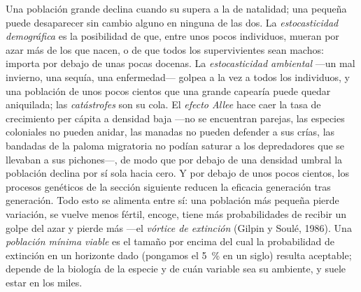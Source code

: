 \begin{definition}\label{def:b3:conservation-biology:small}
Una población grande declina cuando su  supera a la
de natalidad; una pequeña puede desaparecer sin cambio alguno en
ninguna de las dos. La \emph{estocasticidad demográfica} es la
posibilidad de que, entre unos pocos individuos, mueran por azar más de
los que nacen, o de que todos los supervivientes sean machos: importa
por debajo de unas pocas docenas. La \emph{estocasticidad ambiental}
---un mal invierno, una sequía, una enfermedad--- golpea a la vez a
todos los individuos, y una población de unos pocos cientos que una
grande capearía puede quedar aniquilada; las \emph{catástrofes} son su
cola. El \emph{efecto Allee} hace caer la tasa de crecimiento per
cápita a densidad baja ---no se encuentran parejas, las especies
coloniales no pueden anidar, las manadas no pueden defender a sus
crías, las bandadas de la paloma migratoria no podían saturar a los
depredadores que se llevaban a sus pichones---, de modo que por debajo
de una densidad umbral la población declina por sí sola hacia cero. Y
por debajo de unos pocos cientos, los procesos genéticos de la sección
siguiente reducen la eficacia generación tras generación. Todo esto se
alimenta entre sí: una población más pequeña pierde variación, se
vuelve menos fértil, encoge, tiene más probabilidades de recibir un
golpe del azar y pierde más ---el \emph{vórtice de extinción} (Gilpin y
Soulé, 1986). Una \emph{población mínima viable} es el tamaño por
encima del cual la probabilidad de extinción en un horizonte dado
(pongamos el \qty{5}{\%} en un siglo) resulta aceptable; depende de la
biología de la especie y de cuán variable sea su ambiente, y suele
estar en los miles.
\end{definition}

